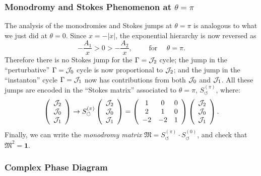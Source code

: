 \documentclass[11pt,a4paper]{article}
\newcommand{\CJ}{{\cal J}}
\newcommand{\be}{\begin{equation}}
\newcommand{\ee}{\end{equation}}
\begin{document}
\subsubsection*{Monodromy and Stokes Phenomenon at $\theta=\pi$}

The analysis of the monodromies and Stokes jumps at $\theta=\pi$ is analogous to what we just did at $\theta=0$. Since $x = -|x|$, the exponential hierarchy is now reversed as
%
\be
-\frac{A_1}{x} > 0 > -\frac{A_2}{x}, \qquad \text{ for } \quad \theta=\pi.
\ee
%
\noindent
Therefore there is no Stokes jump for the $\Gamma = \CJ_2$ cycle; the jump in the ``perturbative'' $\Gamma = \CJ_0$ cycle is now proportional to $\CJ_2$; and the jump in the ``instanton'' cycle $\Gamma = \CJ_1$ now has contributions from both $\CJ_0$ and $\CJ_1$. All these jumps are encoded in the ``Stokes matrix'' associated to $\theta=\pi$, $S_{\circlearrowleft}^{(\pi)}$, where:
%
\begin{equation}
\label{ell-monodromy-pi}
\left(
\begin{array}{ccc}
\CJ_2 \\
\CJ_0 \\
\CJ_1
\end{array}
\right) \to S_{\circlearrowleft}^{(\pi)} \left(
\begin{array}{ccc}
\CJ_2 \\
\CJ_0 \\
\CJ_1
\end{array}
\right) = \left(
\begin{array}{ccc}
 1 &  0 & 0 \\
 2 &  1 & 0 \\
-2 & -2 & 1
\end{array}
\right)  \left(
\begin{array}{ccc}
\CJ_2 \\
\CJ_0 \\
\CJ_1
\end{array}
\right).
\end{equation}
%
\noindent
Finally, we can write the \textit{monodromy matrix} $\mathfrak{M} = S_{\circlearrowleft}^{(\pi)} \cdot S_{\circlearrowleft}^{(0)}$, and check that $\mathfrak{M}^2 = \boldsymbol{1}$.

\subsubsection*{Complex Phase Diagram}
\end{document}
